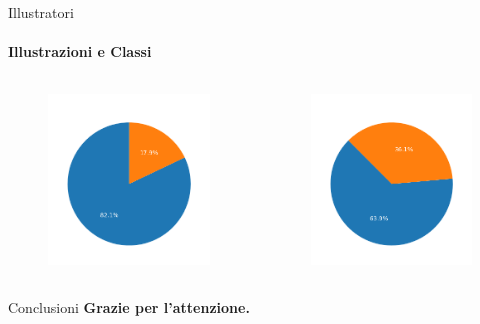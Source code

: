 \documentclass{beamer}
\begin{document}
\begin{darkframes}
  \begin{frame}{Illustratori}
    \framesubtitle{Illustrazioni e Classi}
    \begin{columns}
      \begin{column}{0.50\textwidth}
        \begin{figure}
          \centering
          \includegraphics[scale=0.55]{./images/ill_extra.png}
        \end{figure}
      \end{column}
      \begin{column}{0.50\textwidth}
        \begin{figure}
          \centering
          \includegraphics[scale=0.55]{./images/wadarco.png}
        \end{figure}
      \end{column}
    \end{columns}
  \end{frame}

  \begin{frame}{Conclusioni}
    \textbf{Grazie per l'attenzione.}
  \end{frame}

\end{darkframes}
\end{document}
